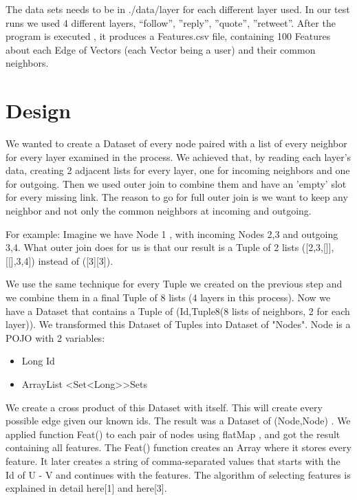 The data sets needs to be in ./data/{layer} for each different layer used. \newline 
In our test runs we used 4 different layers, “follow”, ”reply”, ”quote”, ”retweet”.
After the program is executed , it produces a Features.csv file, containing 100 Features about each Edge of Vectors (each Vector being a user) and their common neighbors. 




\section{Design}
We wanted to create a Dataset of every node paired with a list of every neighbor for every layer examined in the process. We achieved that, by reading each layer's data, creating 2 adjacent lists for every layer, one for incoming neighbors and one for outgoing. Then we used outer join to combine them and have an 'empty' slot for every missing link. The reason to go for full outer join is we want to keep any neighbor and not only the common neighbors at incoming and outgoing.

For example: Imagine we have Node 1 , with incoming Nodes 2,3 and outgoing 3,4. What outer join does for us is that our result is a Tuple of 2 lists ([2,3,[]],[[],3,4]) instead of ([3][3]).

We use the same technique for every Tuple we created on the previous step and we combine them in a final Tuple of 8 lists (4 layers in this process).  Now we have a Dataset that contains a Tuple of (Id,Tuple8(8 lists of neighbors, 2 for each layer)). 
We transformed this Dataset of Tuples into Dataset of "Nodes". Node is a POJO with 2 variables: 
\begin{itemize}
    \item Long Id
    \item ArrayList \textless Set\textless Long\textgreater \textgreater  Sets
\end{itemize}

We create a cross product of this Dataset with itself. This will create every possible edge given our known ids. The result was a Dataset of (Node,Node) . We applied function Feat() to each pair of nodes using flatMap , and got the result containing all features. The Feat() function creates an Array where it stores every feature. It later creates a string of comma-separated values that starts with the Id of U - V and continues with the features.  The algorithm of selecting features is explained in detail here[1] and here[3]. 

